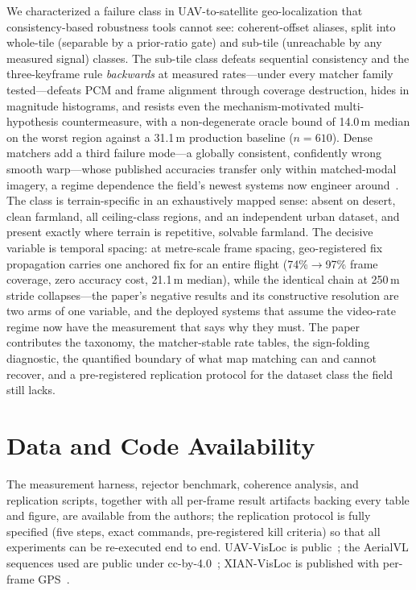\documentclass[journal]{IEEEtran}
\begin{document}
We characterized a failure class in UAV-to-satellite geo-localization that consistency-based robustness tools cannot see: coherent-offset aliases, split into whole-tile (separable by a prior-ratio gate) and sub-tile (unreachable by any measured signal) classes. The sub-tile class defeats sequential consistency and the three-keyframe rule \emph{backwards} at measured rates---under every matcher family tested---defeats PCM and frame alignment through coverage destruction, hides in magnitude histograms, and resists even the mechanism-motivated multi-hypothesis countermeasure, with a non-degenerate oracle bound of 14.0\,m median on the worst region against a 31.1\,m production baseline ($n=610$). Dense matchers add a third failure mode---a globally consistent, confidently wrong smooth warp---whose published accuracies transfer only within matched-modal imagery, a regime dependence the field's newest systems now engineer around~\cite{loretta,satroma}. The class is terrain-specific in an exhaustively mapped sense: absent on desert, clean farmland, all ceiling-class regions, and an independent urban dataset, and present exactly where terrain is repetitive, solvable farmland. The decisive variable is temporal spacing: at metre-scale frame spacing, geo-registered fix propagation carries one anchored fix for an entire flight (74\%$\to$97\% frame coverage, zero accuracy cost, 21.1\,m median), while the identical chain at 250\,m stride collapses---the paper's negative results and its constructive resolution are two arms of one variable, and the deployed systems that assume the video-rate regime now have the measurement that says why they must. The paper contributes the taxonomy, the matcher-stable rate tables, the sign-folding diagnostic, the quantified boundary of what map matching can and cannot recover, and a pre-registered replication protocol for the dataset class the field still lacks.

\section*{Data and Code Availability}
The measurement harness, rejector benchmark, coherence analysis, and replication scripts, together with all per-frame result artifacts backing every table and figure, are available from the authors; the replication protocol is fully specified (five steps, exact commands, pre-registered kill criteria) so that all experiments can be re-executed end to end. UAV-VisLoc is public~\cite{uavvisloc}; the AerialVL sequences used are public under cc-by-4.0~\cite{aerialvl}; XIAN-VisLoc is published with per-frame GPS~\cite{xianvisloc}.



\end{document}
